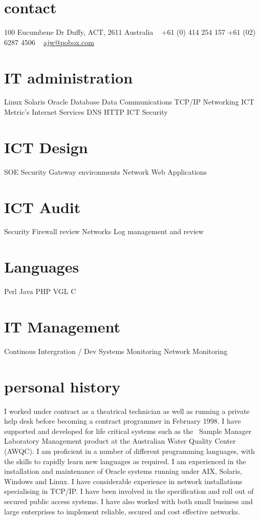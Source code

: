 \documentclass[]{friggeri-cv} %
\begin{document}


\begin{aside} %
\section{contact}
100 Eucumbene Dr
Duffy, ACT, 2611
Australia
~
+61 (0) 414 254 157
+61 (02) 6287 4506
~
\href{mailto:ajw@pobox.com}{ajw@pobox.com}
\section{IT administration}
Linux
Solaris
Oracle Database
Data Communications
TCP/IP Networking
ICT Metric's
Internet Services
DNS
HTTP
ICT Security
\section{ICT Design}
SOE
Security
Gateway environments
Network
Web Applications
\section{ICT Audit}
Security
Firewall review
Networks
Log management and review
\section{Languages}
Perl
Java
PHP
VGL
C
\section{IT Management}
Continous Intergration / Dev
Systems Monitoring
Network Monitoring
\end{aside}

\section{personal history}
I worked under contract as a theatrical technician as well as running a private help desk before becoming a contract programmer in February 1998. I have supported and developed for life critical systems such as the  Sample Manager Laboratory Management product at the Australian Water Quality Center (AWQC). I am proficient in a number of different programming languages, with the skills to rapidly learn new languages as required. I am experienced in the installation and maintenance of Oracle systems running under AIX, Solaris, Windows and Linux. I have considerable experience in network installations specialising in TCP/IP. I have been involved in the specification and roll out of secured public access systems. I have also worked with both small business and large enterprises to implement reliable, secured and cost effective networks.
\end{document}
